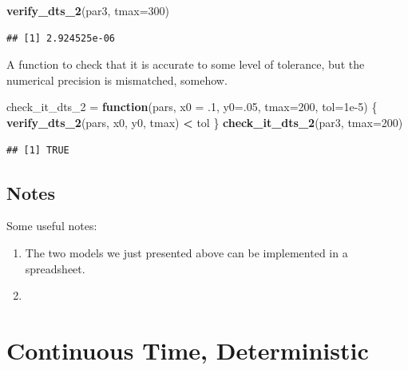 \documentclass[
]{book}
\newenvironment{Shaded}{\begin{snugshade}}{\end{snugshade}}
\newcommand{\AttributeTok}[1]{\textcolor[rgb]{0.13,0.29,0.53}{#1}}
\newcommand{\ControlFlowTok}[1]{\textcolor[rgb]{0.13,0.29,0.53}{\textbf{#1}}}
\newcommand{\DecValTok}[1]{\textcolor[rgb]{0.00,0.00,0.81}{#1}}
\newcommand{\FloatTok}[1]{\textcolor[rgb]{0.00,0.00,0.81}{#1}}
\newcommand{\FunctionTok}[1]{\textcolor[rgb]{0.13,0.29,0.53}{\textbf{#1}}}
\newcommand{\NormalTok}[1]{#1}
\newcommand{\OtherTok}[1]{\textcolor[rgb]{0.56,0.35,0.01}{#1}}
\newcommand{\SpecialCharTok}[1]{\textcolor[rgb]{0.81,0.36,0.00}{\textbf{#1}}}
\begin{document}
\begin{Shaded}
\begin{Highlighting}[]
\FunctionTok{verify\_dts\_2}\NormalTok{(par3, }\AttributeTok{tmax=}\DecValTok{300}\NormalTok{)}
\end{Highlighting}
\end{Shaded}

\begin{verbatim}
## [1] 2.924525e-06
\end{verbatim}

A function to check that it is accurate to some level of tolerance, but the numerical precision is mismatched, somehow.

\begin{Shaded}
\begin{Highlighting}[]
\NormalTok{check\_it\_dts\_2 }\OtherTok{=} \ControlFlowTok{function}\NormalTok{(pars, }\AttributeTok{x0 =}\NormalTok{ .}\DecValTok{1}\NormalTok{, }\AttributeTok{y0=}\NormalTok{.}\DecValTok{05}\NormalTok{, }\AttributeTok{tmax=}\DecValTok{200}\NormalTok{, }\AttributeTok{tol=}\FloatTok{1e{-}5}\NormalTok{)}
\NormalTok{\{}
  \FunctionTok{verify\_dts\_2}\NormalTok{(pars, x0, y0, tmax) }\SpecialCharTok{\textless{}}\NormalTok{ tol}
\NormalTok{\}}
\FunctionTok{check\_it\_dts\_2}\NormalTok{(par3, }\AttributeTok{tmax=}\DecValTok{200}\NormalTok{)}
\end{Highlighting}
\end{Shaded}

\begin{verbatim}
## [1] TRUE
\end{verbatim}

\subsection{Notes}\label{notes}

Some useful notes:

\begin{enumerate}
\def\labelenumi{\arabic{enumi}.}
\item
  The two models we just presented above can be implemented in a spreadsheet.
\item
\end{enumerate}

\section{Continuous Time, Deterministic}\label{continuous-time-deterministic}
\end{document}
